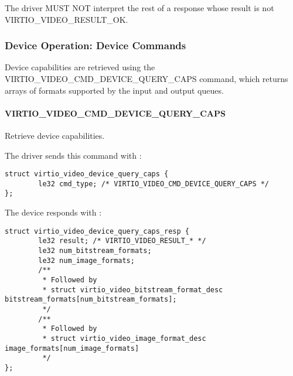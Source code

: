 
The driver MUST NOT interpret the rest of a response whose result is not
VIRTIO_VIDEO_RESULT_OK.

\subsubsection{Device Operation: Device Commands}\label{sec:Device Types / Video Device / Device Operation / Device Operation: Device Commands}

Device capabilities are retrieved using the
VIRTIO_VIDEO_CMD_DEVICE_QUERY_CAPS command, which returns arrays of
formats supported by the input and output queues.

\paragraph{VIRTIO_VIDEO_CMD_DEVICE_QUERY_CAPS}\label{sec:Device Types / Video Device / Device Operation / Device Operation: Device Commands / VIRTIO_VIDEO_CMD_DEVICE_QUERY_CAPS}

Retrieve device capabilities.

The driver sends this command with
:

\begin{lstlisting}
struct virtio_video_device_query_caps {
        le32 cmd_type; /* VIRTIO_VIDEO_CMD_DEVICE_QUERY_CAPS */
};
\end{lstlisting}

The device responds with
:

\begin{lstlisting}
struct virtio_video_device_query_caps_resp {
        le32 result; /* VIRTIO_VIDEO_RESULT_* */
        le32 num_bitstream_formats;
        le32 num_image_formats;
        /**
         * Followed by
         * struct virtio_video_bitstream_format_desc bitstream_formats[num_bitstream_formats];
         */
        /**
         * Followed by
         * struct virtio_video_image_format_desc image_formats[num_image_formats]
         */
};
\end{lstlisting}

